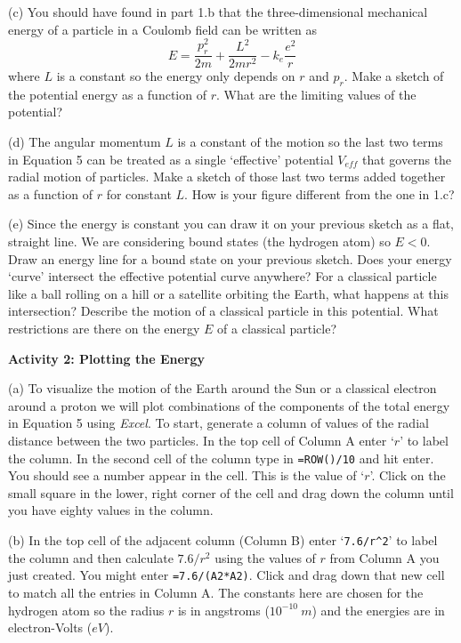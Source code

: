 (c) You should have found in part 1.b that the three-dimensional
mechanical energy of a particle in a Coulomb 
field can be written as
\begin{equation}
E = \frac{p_r^2}{2m} + \frac{L^2}{2mr^2} - k_e\frac{e^2}{r}
\end{equation}
where $L$ is a constant so the energy only depends on $r$ and $p_r$.
Make a sketch of the potential energy as a function of $r$.
What are the limiting values of the potential?
\answerspace{3.0cm}

(d) The angular momentum $L$ is a constant of the motion so the last two terms in 
Equation 5 can be treated as a single `effective' potential $V_{eff}$ that governs the radial motion
of particles.
Make a sketch of those last two terms added together as a function of $r$ for constant $L$.
How is your figure different from the one in 1.c?
\answerspace{3.0cm}


(e) Since the energy is constant you can draw it on your previous sketch as a flat, straight
line. We are considering bound states (the hydrogen atom) so $E < 0$.
Draw an energy line for a bound state on your previous sketch.
Does your energy `curve' intersect the effective potential curve anywhere?
For a classical particle like a ball rolling on a hill or a satellite orbiting the
Earth,
what happens at this intersection?
Describe the motion of a classical particle in this potential.
What restrictions are there on the energy $E$ of a classical particle?
\answerspace{3.0cm}

\textbf{Activity 2: Plotting the Energy}

(a) To visualize the motion of the Earth around the Sun or a classical electron around
a proton we will plot combinations of the components of the total energy in Equation 5
using {\it Excel}. To start, generate a column of values of the radial distance between
the two particles.
In the top cell of Column A enter `$r$' to label the column.
In the second cell of the column type in {\tt =ROW()/10} and hit enter.
You should see a number appear in the cell.
This is the value of `$r$'.
Click on the small square in the lower, right corner of the cell and drag down the 
column until you have eighty values in the column.

(b) In the top cell of the adjacent column (Column B) 
enter `{\tt 7.6/r\^{}2}' to label the column and then calculate 
$7.6/r^2$ using the values of $r$ from Column A you just created.
You might enter {\tt =7.6/(A2*A2)}.
Click and drag down that new cell to match all the entries in Column A.
The constants here are chosen for the hydrogen atom so the radius $r$
is in angstroms ($10^{-10}~m$) and the energies are in electron-Volts ($eV$).

